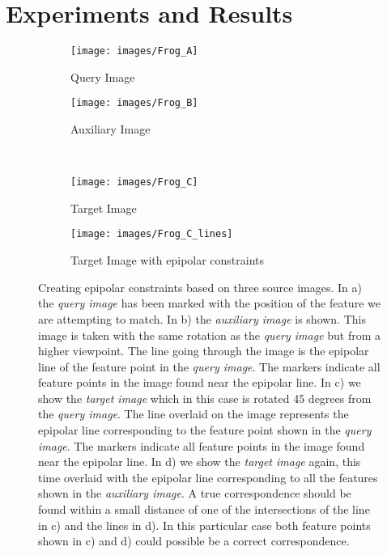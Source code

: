\documentclass[journal]{IEEEtran}
\begin{document}
\section{Experiments and Results}
\label{S:Experiments}
%
\begin{figure}[htb]
    \begin{subfigure}[t]{0.48\columnwidth}
        \centering
        \texttt{[image: images/Frog\_A]}
        \caption{Query Image}
        \label{fig:frog_a}
    \end{subfigure}%
    \quad %
    \begin{subfigure}[t]{0.48\columnwidth}
        \centering
        \texttt{[image: images/Frog\_B]}
        \caption{Auxiliary Image}
        \label{fig:frog_b}
    \end{subfigure}%
    \\ %
    \begin{subfigure}[t]{0.48\columnwidth}
        \centering
        \texttt{[image: images/Frog\_C]}
        \caption{Target Image}
        \label{fig:frog_c}
    \end{subfigure}%
    \quad %
    \begin{subfigure}[t]{0.48\columnwidth}
        \centering
        \texttt{[image: images/Frog\_C\_lines]}
        \caption{Target Image with epipolar constraints}
        \label{fig:frog_c_lines}
    \end{subfigure}%
    \caption{Creating epipolar constraints based on three source images.  
        In a) the \emph{query image} has been marked with the position 
        of the feature we are attempting to match. In b) the 
        \emph{auxiliary image} is shown. This image is taken with the 
        same rotation as the \emph{query image} but from a higher 
        viewpoint. The line going through the image is the epipolar line 
        of the feature point in the \emph{query image}.  The markers 
        indicate all feature points in the image found near the epipolar 
        line.  In c) we show the \emph{target image} which in this case 
        is rotated 45 degrees from the \emph{query image}.  The line 
        overlaid on the image represents the epipolar line corresponding 
        to the feature point shown in the \emph{query image}.  The 
        markers indicate all feature points in the image found near the 
    epipolar line. In d) we show the \emph{target image} again, this 
time overlaid with the epipolar line corresponding to all the features 
shown in the \emph{auxiliary image}. A true correspondence should be 
found within a small distance of one of the intersections of the line in 
c) and the lines in d). In this particular case both feature points 
shown in c) and d) could possible be a correct correspondence.
}%
    \label{fig:frog}%
\end{figure}%
\end{document}
